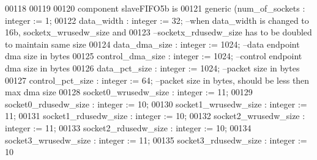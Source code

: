 \begin{DoxyCode}
00118 
00119 
00120 \textcolor{keywordflow}{component} slaveFIFO5b \textcolor{keywordflow}{is}
00121     \textcolor{keywordflow}{generic} (num_of_sockets         : \textcolor{comment}{integer} := \textcolor{vhdllogic}{}\textcolor{vhdllogic}{1};
00122                 data_width              : \textcolor{comment}{integer} := \textcolor{vhdllogic}{}\textcolor{vhdllogic}{32};                                \textcolor{keyword}{--when data\_width
       is changed to 16b, socketx\_wrusedw\_size and }
00123 \textcolor{keyword}{                                                                                                
      --socketx\_rdusedw\_size has to be doubled to maintain same size}
00124                 data_dma_size           : \textcolor{comment}{integer} := \textcolor{vhdllogic}{}\textcolor{vhdllogic}{1024};                          \textcolor{keyword}{--data endpoint dma
       size in bytes}
00125                 control_dma_size        : \textcolor{comment}{integer} := \textcolor{vhdllogic}{}\textcolor{vhdllogic}{1024};                          \textcolor{keyword}{--control endpoint dma
       size in bytes}
00126                 data_pct_size           : \textcolor{comment}{integer} := \textcolor{vhdllogic}{}\textcolor{vhdllogic}{1024};                          \textcolor{keyword}{--packet size in bytes}
00127                 control_pct_size        : \textcolor{comment}{integer} := \textcolor{vhdllogic}{}\textcolor{vhdllogic}{64};                                \textcolor{keyword}{--packet size in
       bytes, should be less then max dma size}
00128                 socket0_wrusedw_size : \textcolor{comment}{integer} := \textcolor{vhdllogic}{}\textcolor{vhdllogic}{11};
00129                 socket0_rdusedw_size    : \textcolor{comment}{integer} := \textcolor{vhdllogic}{}\textcolor{vhdllogic}{10};
00130                 socket1_wrusedw_size : \textcolor{comment}{integer} := \textcolor{vhdllogic}{}\textcolor{vhdllogic}{11};
00131                 socket1_rdusedw_size    : \textcolor{comment}{integer} := \textcolor{vhdllogic}{}\textcolor{vhdllogic}{10};
00132                 socket2_wrusedw_size : \textcolor{comment}{integer} := \textcolor{vhdllogic}{}\textcolor{vhdllogic}{11};
00133                 socket2_rdusedw_size    : \textcolor{comment}{integer} := \textcolor{vhdllogic}{}\textcolor{vhdllogic}{10};
00134                 socket3_wrusedw_size : \textcolor{comment}{integer} := \textcolor{vhdllogic}{}\textcolor{vhdllogic}{11};
00135                 socket3_rdusedw_size    : \textcolor{comment}{integer} := \textcolor{vhdllogic}{}\textcolor{vhdllogic}{10}

\end{DoxyCode}
